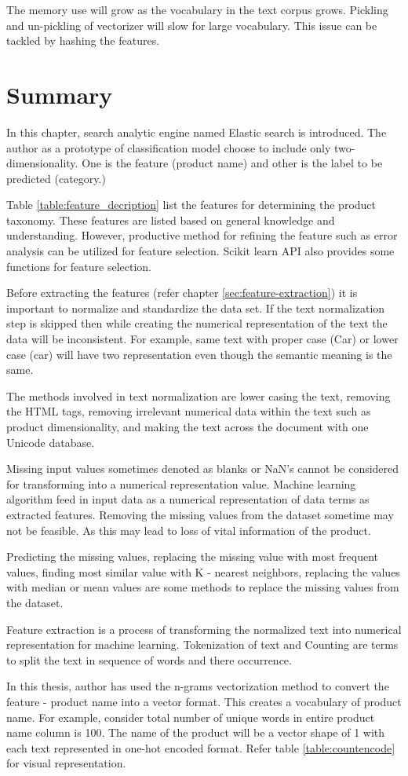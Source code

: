 The memory use will grow as the vocabulary in the text corpus grows.  Pickling and un-pickling of vectorizer will slow for large vocabulary.
This issue can be tackled by hashing the features. 

\clearpage
\section{Summary}

In this chapter, search analytic engine named Elastic search is introduced. The author as a prototype of classification model choose to include only two-dimensionality. One is the feature (product name) and other is the label to be predicted (category.)

Table \ref{table:feature_decription} list the features for determining the product taxonomy. These features are listed based on general knowledge and understanding. However, productive method for refining the feature such as error analysis can be utilized for feature selection. Scikit learn API \parencite{sklearn_api} also provides some functions for feature selection.

Before extracting the features (refer chapter \ref{sec:feature-extraction}) it is important to normalize and standardize the data set. If the text normalization step is skipped then while creating the numerical representation of the text the data will be inconsistent. For example, same text with proper case (Car) or lower case (car) will have two representation even though the semantic meaning is the same.  

The methods involved in text normalization are lower casing the text, removing the HTML tags, removing irrelevant numerical data within the text such as product dimensionality, and making the text across the document with one Unicode database.

Missing input values sometimes denoted as blanks or NaN's cannot be considered for transforming into a numerical representation value. Machine learning algorithm feed in input data as a numerical representation of data terms as extracted features. Removing the missing values from the dataset sometime may not be feasible. As this may lead to loss of vital information of the product. 

Predicting the missing values, replacing the missing value with most frequent values, finding most similar value with K - nearest neighbors, replacing the values with median or mean values are some methods to replace the missing values from the dataset.


Feature extraction is a process of transforming the normalized text into numerical representation for machine learning.  Tokenization of text and Counting are terms to split the text in sequence of words and there occurrence. 

In this thesis, author has used the n-grams vectorization method to convert the feature - product name into a vector format. This creates a vocabulary of product name. For example, consider total number of unique words in entire product name column is 100. The name of the product will be a vector shape of 1  with each text represented in one-hot encoded format. Refer table \ref{table:countencode} for visual representation.
